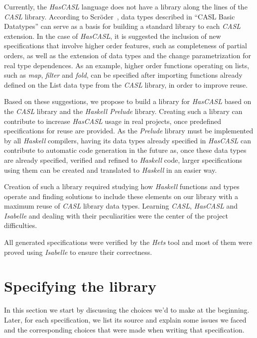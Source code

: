 \documentclass[12pt,twoside]{article}
\numberwithin{spec}{subsection}
\numberwithin{proof}{subsection}
\numberwithin{figure}{subsection}
\numberwithin{code}{subsection}
\begin{document}
Currently, the \textit{HasCASL} language does not have a library along the lines of the \textit{CASL} library. According to Scr\"oder~\citep{Schroder2006}, data types described in ``CASL Basic Datatypes'' can serve as a basis for building a standard library to each \textit{CASL} extension. In the case of \textit{HasCASL}, it is suggested the inclusion of new specifications that involve higher order features, such as completeness of partial orders, as well as the extension of data types and the change parametrization for real type dependences. As an example, higher order functions operating on lists, such as \textit{map}, \textit{filter} and \textit{fold}, can be specified after importing functions already defined on the List data type from the \textit{CASL} library, in order to improve reuse.

Based on these suggestions, we propose to build a library for \textit{HasCASL} based on the \textit{CASL} library and the \textit{Haskell Prelude} library. Creating such a library can contribute to increase \textit{HasCASL} usage in real projects, once predefined specifications for reuse are provided. As the \textit{Prelude} library must be implemented by all \textit{Haskell} compilers, having its data types already specified in \textit{HasCASL} can contribute to automatic code generation in the future as, once these data types are already specified, verified and refined to \textit{Haskell} code, larger specifications using them can be created and translated to \textit{Haskell} in an easier way.

Creation of such a library required studying how \textit{Haskell} functions and types operate and finding solutions to include these elements on our library with a maximum reuse of \textit{CASL} library data types. Learning \textit{CASL}, \textit{HasCASL} and \textit{Isabelle} and dealing with their peculiarities were the center of the project difficulties. 

All generated specifications were verified by the \textit{Hets} tool and most of them were proved using \textit{Isabelle} to ensure their correctness.

\section{Specifying the library}\label{Specification}
In this section we start by discussing the choices we'd to make at the beginning. Later, for each specification, we list its source and explain some issues we faced and the corresponding choices that were made when writing that specification.
\end{document}
